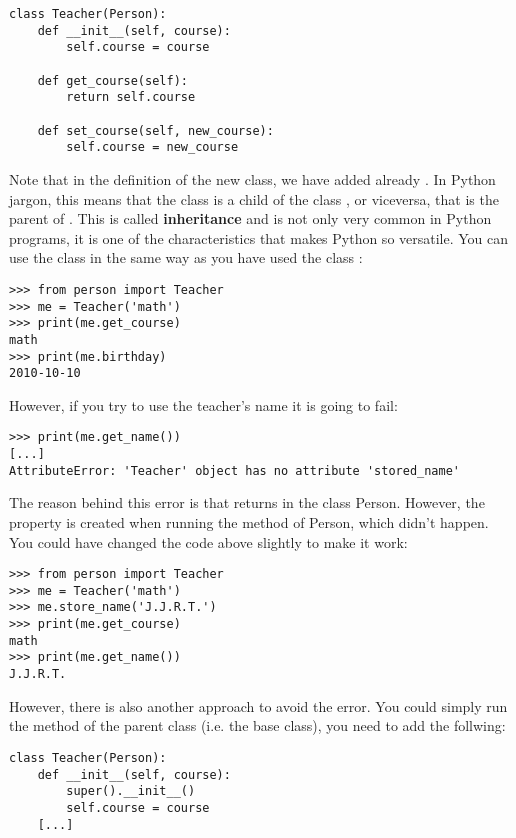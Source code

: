 \begin{verbatim}
class Teacher(Person):
    def __init__(self, course):
        self.course = course

    def get_course(self):
        return self.course

    def set_course(self, new_course):
        self.course = new_course
\end{verbatim}

Note that in the definition of the new  class, we have added already . In Python jargon, this means that the class  is a child of the class , or viceversa, that  is the parent of . This is called \textbf{inheritance} and is not only very common in Python programs, it is one of the characteristics that makes Python so versatile. You can use the class  in the same way as you have used the class :

\begin{verbatim}
>>> from person import Teacher
>>> me = Teacher('math')
>>> print(me.get_course)
math
>>> print(me.birthday)
2010-10-10
\end{verbatim}

However, if you try to use the teacher's name it is going to fail:

\begin{verbatim}
>>> print(me.get_name())
[...]
AttributeError: 'Teacher' object has no attribute 'stored_name'
\end{verbatim}

The reason behind this error is that  returns  in the class Person. However, the property  is created when running the  method of Person, which didn't happen. You could have changed the code above slightly to make it work:

\begin{verbatim}
>>> from person import Teacher
>>> me = Teacher('math')
>>> me.store_name('J.J.R.T.')
>>> print(me.get_course)
math
>>> print(me.get_name())
J.J.R.T.
\end{verbatim}

However, there is also another approach to avoid the error. You could simply run the  method of the parent class (i.e. the base class), you need to add the follwing:

\begin{verbatim}
class Teacher(Person):
    def __init__(self, course):
        super().__init__()
        self.course = course
    [...]
\end{verbatim}

